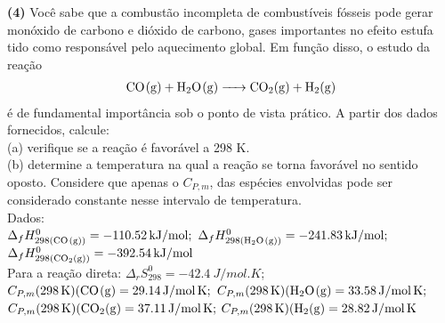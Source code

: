 \textbf{(4)} Você sabe que a combustão incompleta de combustíveis fósseis
pode gerar monóxido de carbono e dióxido de carbono, gases importantes no efeito
estufa tido como responsável pelo aquecimento global. Em função disso, o estudo
da reação
\begin{align*}
    \ce{CO(g) + H2O(g) -> CO2(g) + H2(g)}
\end{align*}
é de fundamental importância sob o ponto de vista prático. A partir dos dados fornecidos,
calcule:\\

(a) verifique se a reação é favorável a 298 K.\\

(b) determine a temperatura na qual a reação se torna favorável no sentido
oposto. Considere que apenas o \(C_{P,m}\), das espécies envolvidas pode ser
considerado constante nesse intervalo de temperatura.\\

\noindent Dados:\\
\( \Delta_f H^0_{298(\ce{CO(g)})} = \qty{-110.52}{kJ \per mol};\) 
\( \Delta_f H^0_{298(\ce{H2O(g)})} = \qty{-241.83}{kJ \per mol};\) 
\( \Delta_f H^0_{298(\ce{CO2(g)})} = \qty{-392.54}{kJ \per mol}\) \\
Para a reação direta: \( \Delta _r S^0_{298} = \qty{-42.4}{J \per mol . K} \);\\
\(C_{P,m} (\qty{298}{K}) (\ce{CO(g)} = \qty{29.14}{J \per mol . K}; \)
\(C_{P,m} (\qty{298}{K}) (\ce{H2O(g)} = \qty{33.58}{J \per mol . K}; \)\\
\(C_{P,m} (\qty{298}{K}) (\ce{CO2(g)} = \qty{37.11}{J \per mol . K}; \)
\(C_{P,m} (\qty{298}{K}) (\ce{H2(g)} = \qty{28.82}{J \per mol . K} \)
